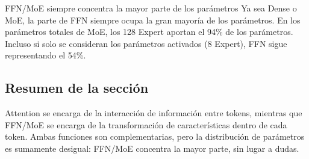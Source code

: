 \begin{knowledgebox}{FFN/MoE siempre concentra la mayor parte de los parámetros}
Ya sea Dense o MoE, la parte de FFN siempre ocupa la gran mayoría de los parámetros. En los parámetros totales de MoE, los 128 Expert aportan el 94\% de los parámetros. Incluso si solo se consideran los parámetros activados (8 Expert), FFN sigue representando el 54\%.
\end{knowledgebox}

\subsection{Resumen de la sección}

Attention se encarga de la interacción de información entre tokens, mientras que FFN/MoE se encarga de la transformación de características dentro de cada token. Ambas funciones son complementarias, pero la distribución de parámetros es sumamente desigual: FFN/MoE concentra la mayor parte, sin lugar a dudas.

